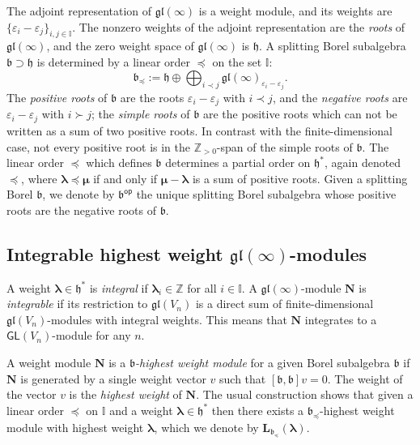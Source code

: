 \documentclass[11pt,fleqn]{amsart}
\newcommand\ZZ{\mathbb Z}
\newcommand\II{\mathbb I}
\renewcommand\epsilon{\varepsilon}
\theoremstyle{definition}
\theoremstyle{remark}
\theoremstyle{remark}
\newcommand\gl{\mathfrak{gl}}
\newcommand\lie[1]{\mathfrak{#1}}
\newcommand\op{\mathsf{op}}
\newcommand\wt[1]{\boldsymbol{#1}}
\begin{document}
The adjoint representation of $\gl(\infty)$ is a weight module, and its weights 
are $\{\epsilon_i - \epsilon_j\}_{i,j \in \II}$. The nonzero weights of the
adjoint representation are the \emph{roots} of $\gl(\infty)$, and the zero 
weight space of $\gl(\infty)$ is $\lie h$. A splitting Borel subalgebra $\lie b 
\supset \lie h$ is determined by a linear order $\preceq$ on the set $\II$:
\[\lie b_{\preceq} := \lie h \oplus \bigoplus_{i \prec j} 
  \gl(\infty)_{\epsilon_i - \epsilon_j}.\]
The \emph{positive roots} of $\lie b$ are the roots $\epsilon_i - \epsilon_j$ 
with $i \prec j$, and the \emph{negative roots} are $\epsilon_i - \epsilon_j$
with $i \succ j$; the \emph{simple roots} of $\lie b$ are the positive roots 
which can not be written as a sum of two positive roots. In contrast with the 
finite-dimensional case, not every positive root is in the $\ZZ_{>0}$-span of 
the simple roots of $\lie b$. The linear order $\preceq$ which defines 
$\lie b$ determines a partial order on $\lie h^*$, again denoted $\preceq$, 
where $\wt\lambda \preceq \wt\mu$ if and only if $\wt\mu - \wt\lambda$ is a sum 
of positive roots. Given a splitting Borel $\lie b$, we denote by $\lie b^{\op}$
the unique splitting Borel subalgebra whose positive roots are the negative 
roots of $\lie b$.

\subsection{Integrable highest weight $\gl(\infty)$-modules}
A weight $\wt\lambda \in \lie h^*$ is \emph{integral} if $\wt\lambda_i \in \ZZ$
for all $i \in \II$. A $\gl(\infty)$-module $\mathbf N$ is \emph{integrable} if 
its restriction to $\gl(V_n)$ is a direct sum of finite-dimensional 
$\gl(V_n)$-modules with integral weights. This means that $\mathbf N$ 
integrates to a $\mathsf{GL}(V_n)$-module for any $n$. 

A weight module $\mathbf N$ is a \emph{$\lie b$-highest weight module} for a 
given Borel 
subalgebra $\lie b$ if $\mathbf N$ is generated by a single weight vector $v$ 
such that $[\lie b, \lie b]v = 0$. The weight of the vector $v$ is the 
\emph{highest weight} of $\mathbf N$. The usual construction shows that given a 
linear order $\preceq$ on $\II$ and a weight $\wt\lambda \in \lie h^*$ then 
there exists a $\lie b_{\preceq}$-highest weight module with highest weight 
$\wt\lambda$, which we denote by $\mathbf L_{\lie b_{\preceq}}(\wt\lambda)$. 
\end{document}
